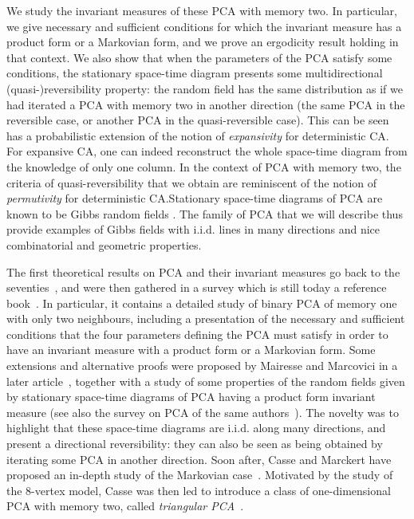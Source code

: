 \documentclass[10pt]{amsart}
\theoremstyle{definition}\newtheorem{defi}[theo]{Definition}\newtheorem{rema}[theo]{Remark}\newtheorem{exam}[theo]{Example}\newtheorem{exem}[theo]{Example}\newtheorem{nota}[theo]{Notation}
\newcounter{a}
\begin{document}
We study the invariant measures of these PCA with memory two. In particular, we give necessary and sufficient conditions for which the invariant measure has a product form or a Markovian form, and we prove an ergodicity result holding in that context. We also show that when the parameters of the PCA satisfy some conditions, the stationary space-time diagram presents some multidirectional (quasi-)reversibility property: the random field has the same distribution as if we had iterated a PCA with memory two in another direction (the same PCA in the reversible case, or another PCA in the quasi-reversible case). This can be seen has a probabilistic extension of the notion of \emph{expansivity} for deterministic CA. For expansive CA, one can indeed reconstruct the whole space-time diagram from the knowledge of only one column. In the context of PCA with memory two, the criteria of quasi-reversibility that we obtain are reminiscent of the notion of \emph{permutivity} for deterministic CA.\linebreak Stationary space-time diagrams of PCA are known to be Gibbs random fields \cite{GKLM,LMS}. The family of PCA that we will describe thus provide examples of Gibbs fields with i.i.d. lines in many directions and nice combinatorial and geometric properties.

The first theoretical results on PCA and their invariant measures go back to the seventies~\cite{belyaev,kozlov,vasilyev}, and were then gathered in a survey which is still today a reference book~\cite{dobrushin}. In particular, it contains a detailed study of binary PCA of memory one with only two neighbours, including a presentation of the necessary and sufficient conditions that the four parameters defining the PCA must satisfy in order to have an invariant measure with a product form or a Markovian form. Some extensions and alternative proofs were proposed by Mairesse and Marcovici in a later article~\cite{mm_ihp}, together with a study of some properties of the random fields given by stationary space-time diagrams of PCA having a product form invariant measure (see also the survey on PCA of the same authors~\cite{mm_tcs}). The novelty was to highlight that these space-time diagrams are i.i.d. along many directions, and present a directional reversibility: they can also be seen as being obtained by iterating some PCA in another direction. Soon after, Casse and Marckert have proposed an in-depth study of the Markovian case~\cite{Casse16,CM15}. Motivated by the study of the $8$-vertex model, Casse was then led to introduce a class of one-dimensional PCA with memory two, called \emph{triangular PCA}~\cite{Casse17}.
\end{document}
